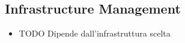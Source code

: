 \subsection{Infrastructure Management}

\begin{itemize}
	\item TODO Dipende dall'infrastruttura scelta
\end{itemize}